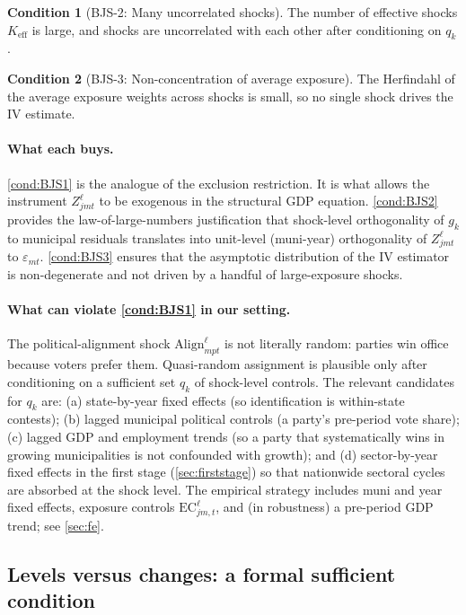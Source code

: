 \documentclass{article}
\newcommand{\Align}{\mathrm{Align}}
\newcommand{\EC}{\mathrm{EC}}
\theoremstyle{plain}
\theoremstyle{definition}
\newtheorem{condition}{Condition}
\theoremstyle{remark}
\begin{document}
\begin{condition}[BJS-2: Many uncorrelated shocks]\label{cond:BJS2}
The number of effective shocks $K_{\mathrm{eff}}$ is large, and shocks are
uncorrelated with each other after conditioning on $q_k$.
\end{condition}

\begin{condition}[BJS-3: Non-concentration of average exposure]\label{cond:BJS3}
The Herfindahl of the average exposure weights across shocks is small, so no
single shock drives the IV estimate.
\end{condition}

\paragraph{What each buys.}
\autoref{cond:BJS1} is the analogue of the exclusion restriction. It is what
allows the instrument $Z^{\ell}_{jmt}$ to be exogenous in the structural
GDP equation. \autoref{cond:BJS2} provides the law-of-large-numbers justification
that shock-level orthogonality of $g_k$ to municipal residuals translates into
unit-level (muni-year) orthogonality of $Z^{\ell}_{jmt}$ to $\varepsilon_{mt}$.
\autoref{cond:BJS3} ensures that the asymptotic distribution of the IV
estimator is non-degenerate and not driven by a handful of large-exposure
shocks.

\paragraph{What can violate \autoref{cond:BJS1} in our setting.}
The political-alignment shock $\Align^{\ell}_{mpt}$ is not literally random:
parties win office because voters prefer them. Quasi-random assignment is
plausible only after conditioning on a sufficient set $q_k$ of shock-level
controls. The relevant candidates for $q_k$ are: (a) state-by-year fixed
effects (so identification is within-state contests); (b) lagged municipal
political controls (a party's pre-period vote share); (c) lagged GDP and
employment trends (so a party that systematically wins in growing
municipalities is not confounded with growth); and (d) sector-by-year fixed
effects in the first stage (\autoref{sec:firststage}) so that nationwide
sectoral cycles are absorbed at the shock level. The empirical strategy
includes muni and year fixed effects, exposure controls $\EC^{\ell}_{jm,t}$,
and (in robustness) a pre-period GDP trend; see \autoref{sec:fe}.

\subsection{Levels versus changes: a formal sufficient condition}
\end{document}
